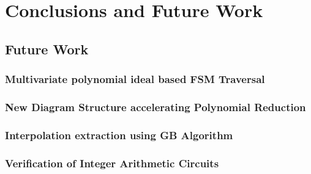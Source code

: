 \chapter{Conclusions and Future Work}
\label{ch:conclude}

\section{Future Work}
\subsection{Multivariate polynomial ideal based FSM Traversal}
\subsection{New Diagram Structure accelerating Polynomial Reduction}
\subsection{Interpolation extraction using GB Algorithm}
\subsection{Verification of Integer Arithmetic Circuits}